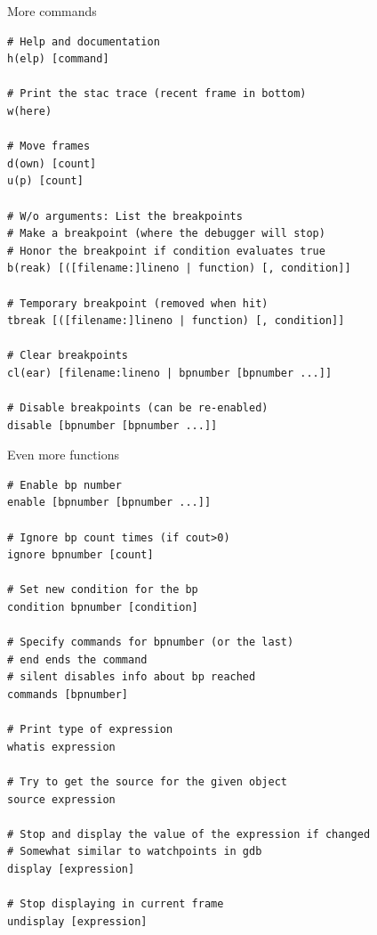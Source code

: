 \documentclass[
    size=20pt,
    style=sailor,
    display=slides,
    paper=smartboard,
    orient=landscape,
]{powerdot}
\begin{document}
\begin{slide}[method=file]{More commands}
\begin{verbatim}
# Help and documentation
h(elp) [command]

# Print the stac trace (recent frame in bottom)
w(here)

# Move frames
d(own) [count]
u(p) [count]

# W/o arguments: List the breakpoints
# Make a breakpoint (where the debugger will stop)
# Honor the breakpoint if condition evaluates true
b(reak) [([filename:]lineno | function) [, condition]]

# Temporary breakpoint (removed when hit)
tbreak [([filename:]lineno | function) [, condition]]

# Clear breakpoints
cl(ear) [filename:lineno | bpnumber [bpnumber ...]]

# Disable breakpoints (can be re-enabled)
disable [bpnumber [bpnumber ...]]

\end{verbatim}
\end{slide}


\begin{slide}[method=file]{Even more functions}
\begin{verbatim}
# Enable bp number
enable [bpnumber [bpnumber ...]]

# Ignore bp count times (if cout>0)
ignore bpnumber [count]

# Set new condition for the bp
condition bpnumber [condition]

# Specify commands for bpnumber (or the last)
# end ends the command
# silent disables info about bp reached
commands [bpnumber]

# Print type of expression
whatis expression

# Try to get the source for the given object
source expression

# Stop and display the value of the expression if changed
# Somewhat similar to watchpoints in gdb
display [expression]

# Stop displaying in current frame
undisplay [expression]
\end{verbatim}
\end{slide}
\end{document}
